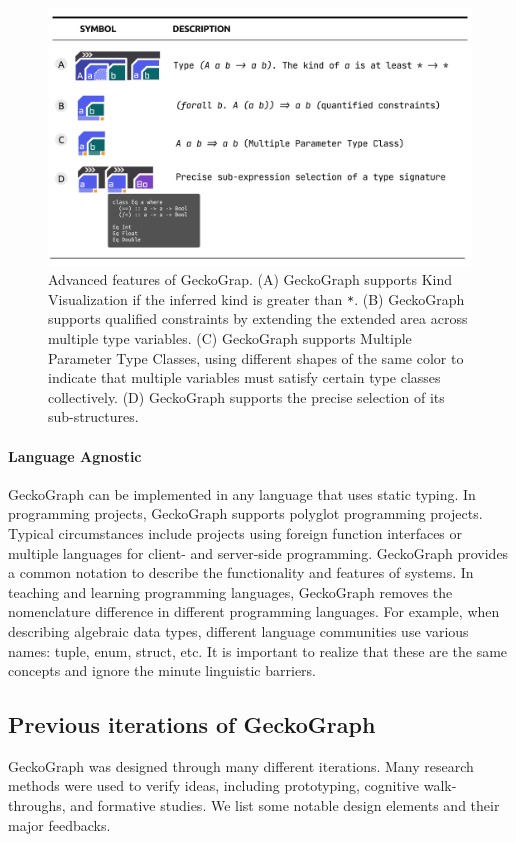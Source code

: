 \begin{figure}[hbt]
\label{fig:advanced}
  \includegraphics[width=\linewidth]{figures/Advanced}
  \caption[Advanced features of GeckoGrap]{
  \label{fig:advanced}
  Advanced features of GeckoGrap. (A) GeckoGraph supports Kind Visualization if the inferred kind is greater than \texttt{*}. (B) GeckoGraph supports qualified constraints by extending the extended area across multiple type variables. (C) GeckoGraph supports Multiple Parameter Type Classes, using different shapes of the same color to indicate that multiple variables must satisfy certain type classes collectively. (D) GeckoGraph supports the precise selection of its sub-structures. }
\end{figure}




\paragraph{Language Agnostic}
GeckoGraph can be implemented in any language that uses static typing. In programming projects, GeckoGraph supports polyglot programming projects. Typical circumstances include projects using foreign function interfaces or multiple languages for client- and server-side programming. GeckoGraph provides a common notation to describe the functionality and features of systems. In teaching and learning programming languages, GeckoGraph removes the nomenclature difference in different programming languages.  For example, when describing algebraic data types, different language communities use various names: tuple, enum, struct, etc. It is important to realize that these are the same concepts and ignore the minute linguistic barriers.

\subsection{Previous iterations of GeckoGraph}
GeckoGraph was designed through many different iterations. Many research methods were used to verify ideas, including prototyping, cognitive walk-throughs, and formative studies.  We list some notable design elements and their major feedbacks.

